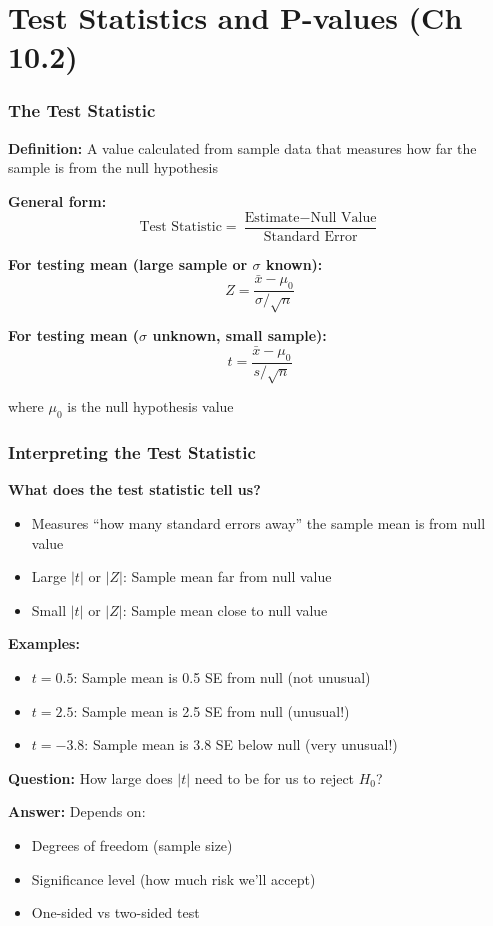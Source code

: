 \documentclass{beamer}
\begin{document}
\section{Test Statistics and P-values (Ch 10.2)}

\begin{frame}
\frametitle{The Test Statistic}
\textbf{Definition:} A value calculated from sample data that measures how far the sample is from the null hypothesis

\vspace{0.4cm}
\textbf{General form:}
$$\text{Test Statistic} = \frac{\text{Estimate} - \text{Null Value}}{\text{Standard Error}}$$

\vspace{0.4cm}
\textbf{For testing mean (large sample or $\sigma$ known):}
$$Z = \frac{\bar{x} - \mu_0}{\sigma/\sqrt{n}}$$

\vspace{0.4cm}
\textbf{For testing mean ($\sigma$ unknown, small sample):}
$$t = \frac{\bar{x} - \mu_0}{s/\sqrt{n}}$$

\vspace{0.3cm}
where $\mu_0$ is the null hypothesis value
\end{frame}

\begin{frame}
\frametitle{Interpreting the Test Statistic}
\textbf{What does the test statistic tell us?}

\vspace{0.3cm}
\begin{itemize}
\item Measures ``how many standard errors away'' the sample mean is from null value
\item Large $|t|$ or $|Z|$: Sample mean far from null value
\item Small $|t|$ or $|Z|$: Sample mean close to null value
\end{itemize}

\vspace{0.5cm}
\textbf{Examples:}
\begin{itemize}
\item $t = 0.5$: Sample mean is 0.5 SE from null (not unusual)
\item $t = 2.5$: Sample mean is 2.5 SE from null (unusual!)
\item $t = -3.8$: Sample mean is 3.8 SE below null (very unusual!)
\end{itemize}

\vspace{0.3cm}
\textbf{Question:} How large does $|t|$ need to be for us to reject $H_0$?

\vspace{0.1cm}
\textbf{Answer:} Depends on:
\begin{itemize}
\item Degrees of freedom (sample size)
\item Significance level (how much risk we'll accept)
\item One-sided vs two-sided test
\end{itemize}
\end{frame}
\end{document}
